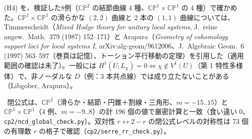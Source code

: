 \begin{rem}[\tQ\ G2 について]
(H4) を、検証した8例（$\mathbb{CP}^2$ の結節曲線 4 種、$\mathbb{CP}^1\times\mathbb{CP}^1$ の 4 種）で確かめた。$\mathbb{CP}^1\times\mathbb{CP}^1$ の滑らかな $(2,2)$ 曲線と 2 本の $(1,1)$ 曲線については、Timmerscheidt（\emph{Mixed Hodge theory for unitary local systems}, J.\ reine angew.\ Math.\ 379 (1987) 152--171）と Arapura（\emph{Geometry of cohomology support loci for local systems I}, arXiv:alg-geom/9612006、J.\ Algebraic Geom.\ 6 (1997) 563--597（巻頁は記憶\tQ）、トーション平行移動の定理）を引用した（適用範囲の確認は未了\tQ）。一般には $H^1(U;L_\chi)=0\Leftrightarrow\chi\notin V^1(U)$（第 1 特性多様体）で、非ノーダルな $D$（例：3 本共点線）では成り立たないことがある（Libgober, Arapura）。
\end{rem}
\tV\ 閉公式は、$\mathbb{CP}^2$（滑らか・結節・円錐＋割線・三角形、$m=-15..15$）と $\mathbb{CP}^1\times\mathbb{CP}^1$（4 例、$m=-9..8$）の計 196 個の値で厳密計算と一致（食い違い 0、\texttt{cp2/ncd\_global\_check.py}）。双対性 $r\leftrightarrow2-r$ の閉公式レベルの対称性は 73 個の有理数 $r$ の格子で確認（\texttt{cp2/serre\_rr\_check.py}）。

